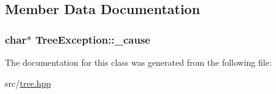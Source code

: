 \subsection{Member Data Documentation}
\hypertarget{class_tree_exception_a90175b0c5a1e2a7ebb77cadc92b0388b}{
\subsubsection[{\-\_\-cause}]{\setlength{\rightskip}{0pt plus 5cm}char$\ast$ Tree\-Exception\-::\-\_\-cause\hspace{0.3cm}{\ttfamily [private]}}}\label{class_tree_exception_a90175b0c5a1e2a7ebb77cadc92b0388b}


The documentation for this class was generated from the following file\-:\begin{DoxyCompactItemize}
\item 
src/\hyperlink{tree_8hpp}{tree.\-hpp}\end{DoxyCompactItemize}
